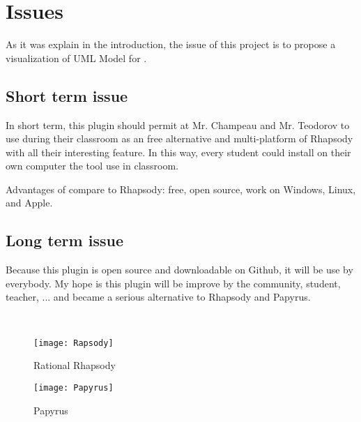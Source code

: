 
\chapter{Issues}
\label{chap:issues}


As it was explain in the introduction, the issue of this project is to propose a visualization of UML Model for \umld.

\section{Short term issue}

In short term, this plugin should permit at Mr. Champeau and Mr. Teodorov to use during their classroom \umld as an free alternative and multi-platform of Rhapsody with all their interesting feature. In this way, every student could install on their own computer the tool use in classroom.

Advantages of \umld compare to Rhapsody: free, open source, work on Windows, Linux, and Apple.

\section{Long term issue}

Because this plugin is open source and downloadable on Github, it will be use by everybody. My hope is this plugin will be improve by the community, student, teacher, \etc... and became a serious alternative to Rhapsody and Papyrus.

~\\

  \begin{figure}[h]
    \begin{minipage}{0.45\linewidth}
      \centering
      \texttt{[image: Rapsody]}
      \caption{Rational Rhapsody}
      \label{fig:rhapsody}
    \end{minipage}\hfill
    \begin{minipage}{0.45\linewidth}
      \centering
      \texttt{[image: Papyrus]}
      \caption{Papyrus}
      \label{fig:papyrus}
    \end{minipage}
  \end{figure}


